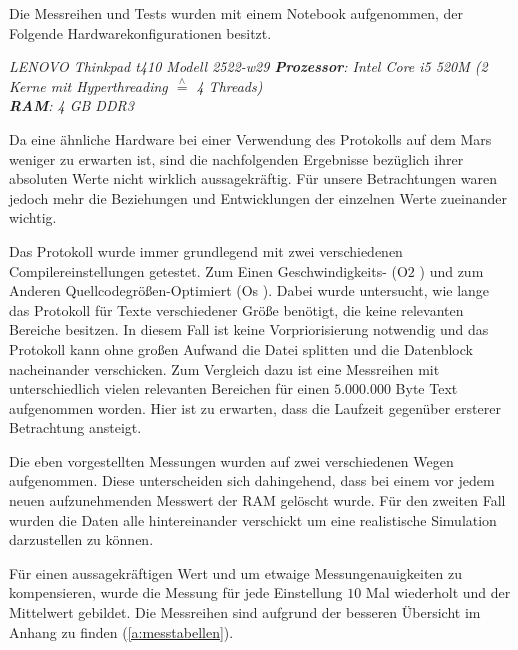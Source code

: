 \label{subCap:Messreihen}

Die Messreihen und Tests wurden mit einem Notebook aufgenommen, der Folgende
Hardwarekonfigurationen besitzt.

\textit{
	LENOVO Thinkpad t410 Modell 2522-w29 \newline
	\textbf{Prozessor}: Intel Core i5 520M (2 Kerne mit Hyperthreading $\stackrel{\wedge}=$ 4 Threads)\\
	\textbf{RAM}: 4 GB DDR3	
	}

Da eine ähnliche Hardware bei einer Verwendung des Protokolls auf dem Mars
weniger zu erwarten ist, sind die nachfolgenden Ergebnisse bezüglich ihrer
absoluten Werte nicht wirklich aussagekräftig. Für unsere Betrachtungen waren
jedoch mehr die Beziehungen und Entwicklungen der einzelnen Werte zueinander
wichtig.

Das Protokoll wurde immer grundlegend mit zwei verschiedenen
Compilereinstellungen getestet. Zum Einen Geschwindigkeits- (\glqq O$2$ \grqq)
und zum Anderen Quellcodegrößen-Optimiert (\glqq Os \grqq). Dabei wurde
untersucht, wie lange das Protokoll für Texte verschiedener Größe benötigt, die
keine relevanten Bereiche besitzen. In diesem Fall ist keine Vorpriorisierung
notwendig und das Protokoll kann ohne großen Aufwand die Datei splitten und die
Datenblock nacheinander verschicken. Zum Vergleich dazu ist eine Messreihen mit
unterschiedlich vielen relevanten Bereichen für einen $5.000.000$ Byte Text
aufgenommen worden. Hier ist zu erwarten, dass die Laufzeit gegenüber ersterer
Betrachtung ansteigt. 

Die eben vorgestellten Messungen wurden auf zwei verschiedenen Wegen
aufgenommen. Diese unterscheiden sich dahingehend, dass bei einem vor jedem
neuen aufzunehmenden Messwert der RAM gelöscht wurde. Für den zweiten Fall
wurden die Daten alle hintereinander verschickt um eine realistische Simulation
darzustellen zu können. 

Für einen aussagekräftigen Wert und um etwaige Messungenauigkeiten zu
kompensieren, wurde die Messung für jede Einstellung $10$ Mal wiederholt und der
Mittelwert gebildet. Die Messreihen sind aufgrund der besseren Übersicht im
Anhang zu finden (\ref{a:messtabellen}).